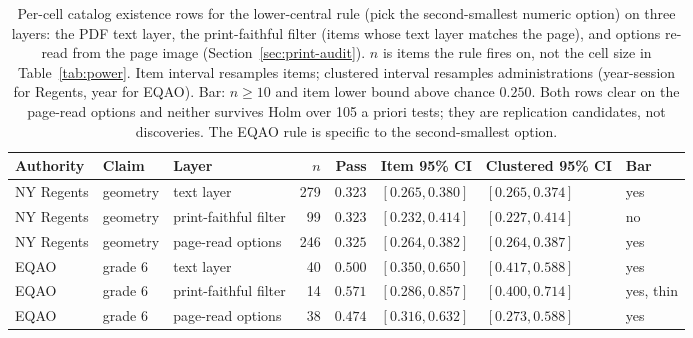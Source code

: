 \begin{table}[t]
  \caption{Per-cell catalog existence rows for the lower-central rule (pick the second-smallest numeric option) on three layers: the PDF text layer, the print-faithful filter (items whose text layer matches the page), and options re-read from the page image (Section~\ref{sec:print-audit}). $n$ is items the rule fires on, not the cell size in Table~\ref{tab:power}. Item interval resamples items; clustered interval resamples administrations (year-session for Regents, year for EQAO). Bar: $n\ge 10$ and item lower bound above chance $0.250$. Both rows clear on the page-read options and neither survives Holm over 105 a priori tests; they are replication candidates, not discoveries. The EQAO rule is specific to the second-smallest option.}
  \label{tab:witnesses}
  \centering
  \small
  \begin{tabular}{l l l r r l l l}
    \toprule
    Authority & Claim & Layer & $n$ & Pass & Item 95\% CI & Clustered 95\% CI & Bar \\
    \midrule
    NY Regents & geometry & text layer & 279 & $0.323$ & $[0.265, 0.380]$ & $[0.265, 0.374]$ & yes \\
    NY Regents & geometry & print-faithful filter & 99 & $0.323$ & $[0.232, 0.414]$ & $[0.227, 0.414]$ & no \\
    NY Regents & geometry & page-read options & 246 & $0.325$ & $[0.264, 0.382]$ & $[0.264, 0.387]$ & yes \\
    EQAO & grade 6 & text layer & 40 & $0.500$ & $[0.350, 0.650]$ & $[0.417, 0.588]$ & yes \\
    EQAO & grade 6 & print-faithful filter & 14 & $0.571$ & $[0.286, 0.857]$ & $[0.400, 0.714]$ & yes, thin \\
    EQAO & grade 6 & page-read options & 38 & $0.474$ & $[0.316, 0.632]$ & $[0.273, 0.588]$ & yes \\
    \bottomrule
  \end{tabular}
\end{table}

